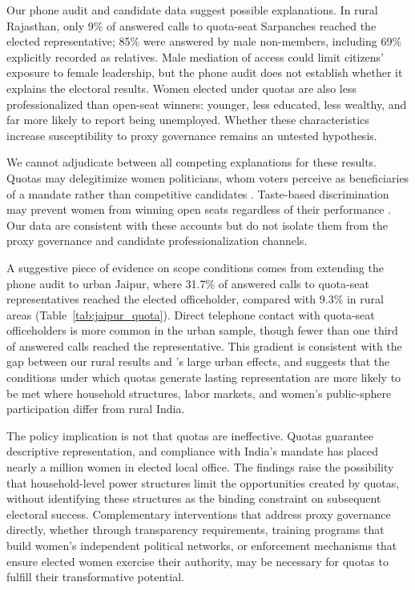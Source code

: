 \documentclass[12pt]{article}
\begin{document}
Our phone audit and candidate data suggest possible explanations. In rural Rajasthan, only 9\% of answered calls to quota-seat Sarpanches reached the elected representative; 85\% were answered by male non-members, including 69\% explicitly recorded as relatives. Male mediation of access could limit citizens' exposure to female leadership, but the phone audit does not establish whether it explains the electoral results. Women elected under quotas are also less professionalized than open-seat winners: younger, less educated, less wealthy, and far more likely to report being unemployed. Whether these characteristics increase susceptibility to proxy governance remains an untested hypothesis.

We cannot adjudicate between all competing explanations for these results. Quotas may delegitimize women politicians, whom voters perceive as beneficiaries of a mandate rather than competitive candidates \citep[p.~111]{krook2006gender}. Taste-based discrimination may prevent women from winning open seats regardless of their performance \citep{desai2024women}. Our data are consistent with these accounts but do not isolate them from the proxy governance and candidate professionalization channels.

A suggestive piece of evidence on scope conditions comes from extending the phone audit to urban Jaipur, where 31.7\% of answered calls to quota-seat representatives reached the elected officeholder, compared with 9.3\% in rural areas (Table~\ref{tab:jaipur_quota}). Direct telephone contact with quota-seat officeholders is more common in the urban sample, though fewer than one third of answered calls reached the representative. This gradient is consistent with the gap between our rural results and \citet{bhavnani2009electoral}'s large urban effects, and suggests that the conditions under which quotas generate lasting representation are more likely to be met where household structures, labor markets, and women's public-sphere participation differ from rural India.

The policy implication is not that quotas are ineffective. Quotas guarantee descriptive representation, and compliance with India's mandate has placed nearly a million women in elected local office. The findings raise the possibility that household-level power structures limit the opportunities created by quotas, without identifying these structures as the binding constraint on subsequent electoral success. Complementary interventions that address proxy governance directly, whether through transparency requirements, training programs that build women's independent political networks, or enforcement mechanisms that ensure elected women exercise their authority, may be necessary for quotas to fulfill their transformative potential.
\end{document}
